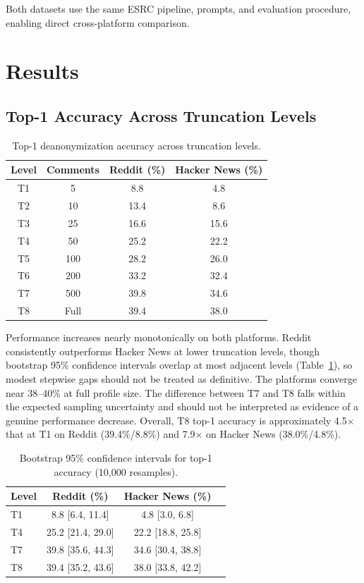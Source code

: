 \documentclass[sigplan,screen,nonacm]{acmart}
\begin{document}
Both datasets use the same ESRC pipeline, prompts, and evaluation procedure,
enabling direct cross-platform comparison.


\section{Results}


\subsection{Top-1 Accuracy Across Truncation Levels}

\begin{table}[H]
\centering
\caption{Top-1 deanonymization accuracy across truncation levels.}
\begin{tabular}{cccc}
\toprule
Level & Comments & Reddit (\%) & Hacker News (\%) \\
\midrule
T1 & 5   & 8.8  & 4.8  \\
T2 & 10  & 13.4 & 8.6  \\
T3 & 25  & 16.6 & 15.6 \\
T4 & 50  & 25.2 & 22.2 \\
T5 & 100 & 28.2 & 26.0 \\
T6 & 200 & 33.2 & 32.4 \\
T7 & 500 & 39.8 & 34.6 \\
T8 & Full & 39.4 & 38.0 \\
\bottomrule
\end{tabular}
\end{table}

Performance increases nearly monotonically on both platforms. Reddit consistently
outperforms Hacker News at lower truncation levels, though bootstrap 95\% confidence
intervals overlap at most adjacent levels (Table~\ref{tab:bootstrap_ci}), so modest
stepwise gaps should not be treated as definitive. The platforms converge near
38--40\% at full profile size. The difference between T7 and T8 falls within the
expected sampling uncertainty and should not be interpreted as evidence of a genuine
performance decrease. Overall, T8 top-1 accuracy is approximately 4.5$\times$ that
at T1 on Reddit (39.4\%/8.8\%) and 7.9$\times$ on Hacker News (38.0\%/4.8\%).

\begin{table}[H]
\centering
\caption{Bootstrap 95\% confidence intervals for top-1 accuracy (10{,}000 resamples).}
\label{tab:bootstrap_ci}
\begin{tabular}{lccc}
\toprule
Level & Reddit (\%) & Hacker News (\%) \\
\midrule
T1 & 8.8 [6.4, 11.4]   & 4.8 [3.0, 6.8]   \\
T4 & 25.2 [21.4, 29.0] & 22.2 [18.8, 25.8] \\
T7 & 39.8 [35.6, 44.3] & 34.6 [30.4, 38.8] \\
T8 & 39.4 [35.2, 43.6] & 38.0 [33.8, 42.2] \\
\bottomrule
\end{tabular}
\end{table}
\end{document}
